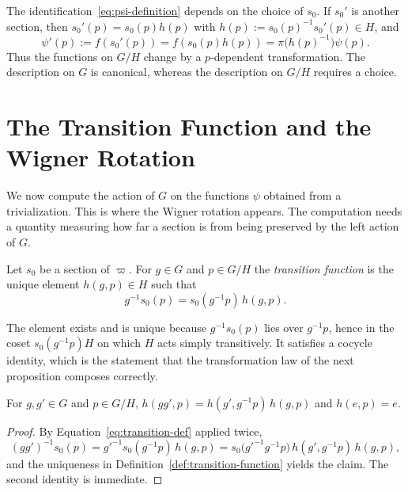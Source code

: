 	\begin{remark}\label{rem:trivialization-dependence}
		The identification~\eqref{eq:psi-definition} depends on the choice of $s_0$. If $s_0'$ is another section, then $s_0'(p)=s_0(p)h(p)$ with $h(p):=s_0(p)^{-1}s_0'(p)\in H$, and
		\begin{equation*}
			\psi'(p):=f(s_0'(p))=f(s_0(p)h(p))=\pi\big(h(p)^{-1}\big)\psi(p).
		\end{equation*}
		Thus the functions on $G/H$ change by a $p$-dependent transformation. The description on $G$ is canonical, whereas the description on $G/H$ requires a choice.
	\end{remark}
	
	\section{The Transition Function and the Wigner Rotation}
	\label{sec:transition-function}
	
	We now compute the action of $G$ on the functions $\psi$ obtained from a trivialization. This is where the Wigner rotation appears. The computation needs a quantity measuring how far a section is from being preserved by the left action of $G$.
	
	\begin{definition}\label{def:transition-function}
		Let $s_0$ be a section of $\varpi$. For $g\in G$ and $p\in G/H$ the \emph{transition function} is the unique element $h(g,p)\in H$ such that
		\begin{equation}\label{eq:transition-def}
			g^{-1}s_0(p)=s_0(g^{-1}p)\,h(g,p).
		\end{equation}
	\end{definition}
	
	The element exists and is unique because $g^{-1}s_0(p)$ lies over $g^{-1}p$, hence in the coset $s_0(g^{-1}p)H$ on which $H$ acts simply transitively. It satisfies a cocycle identity, which is the statement that the transformation law of the next proposition composes correctly.
	
	\begin{lemma}\label{lem:transition-cocycle}
		For $g,g'\in G$ and $p\in G/H$, $h(gg',p)=h(g',g^{-1}p)\,h(g,p)$ and $h(e,p)=e$.
	\end{lemma}
	
	\begin{proof}
		By Equation~\eqref{eq:transition-def} applied twice,
		\begin{equation*}
			(gg')^{-1}s_0(p)=g'^{-1}s_0(g^{-1}p)\,h(g,p)=s_0\big(g'^{-1}g^{-1}p\big)\,h(g',g^{-1}p)\,h(g,p),
		\end{equation*}
		and the uniqueness in Definition~\ref{def:transition-function} yields the claim. The second identity is immediate.
	\end{proof}
	
